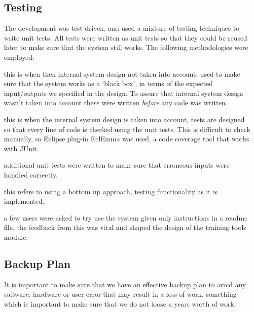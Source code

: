 \documentclass[12pt,twoside,notitlepage]{report}
\begin{document}
        \subsection{Testing}
            The development was test driven, and used a mixture of testing techniques to write unit tests. All tests 
            were written as unit tests so that they could be reused later to make sure that the system still works.
            The following methodologies were employed:
            \begin{description}[font=\normalfont\itshape, labelindent=10pt]
                \item[Black box testing:] this is when then internal system design not taken into account, used to make sure 
                    that the system works as a `black box', in terms of the expected input/outputs we specified in the 
                    design. To assure that internal system design wasn't taken into account these were written 
                    \textit{before} any code was written.
                \item[White box testing:] this is when the internal system design is taken into account, tests are designed so that every 
                    line of code is checked using the unit tests. This is difficult to check manually, so Eclipse plug-in 
                    EclEmma was used, a code coverage tool that works with JUnit.
                \item[Input sanitisation testing:] additional unit tests were written to make sure that erroneous inputs 
                    were handled correctly.
                \item[Incremental integration testing:] this refers to using a bottom up approach, testing functionality 
                    as it is implemented.
                \item[Usability testing:] a few users were asked to try use the system given only instructions in a readme 
                    file, the feedback from this was vital and shaped the design of the training tools module.
            \end{description}

        \subsection{Backup Plan}
            It is important to make sure that we have an effective backup plan to avoid any software, hardware or 
            user error that may result in a loss of work, something which is important to make sure that we do not 
            loose a years worth of work. 
\end{document}
